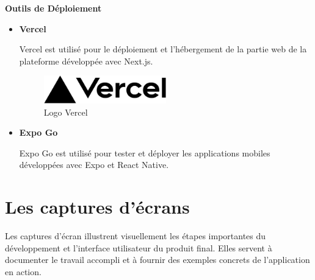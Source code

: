\textbf{Outils de Déploiement}
\begin{itemize}
  \item \textbf{Vercel}

    Vercel est utilisé pour le déploiement et l'hébergement de la partie web
    de la plateforme développée avec Next.js.

    \begin{figure}[H]
      \centering
      \includegraphics[width=0.5\textwidth]{images/Vercel_logo_black.svg.png}
      \caption{Logo Vercel}
    \end{figure}

  \item \textbf{Expo Go}

    Expo Go est utilisé pour tester et déployer les applications mobiles
    développées avec Expo et React Native.
\end{itemize}


\section{Les captures d'écrans}
Les captures d’écran illustrent visuellement les étapes importantes du
développement et l’interface utilisateur du produit final. Elles servent à
documenter le travail accompli et à fournir des exemples concrets de
l’application en action.


%
%
%
%

